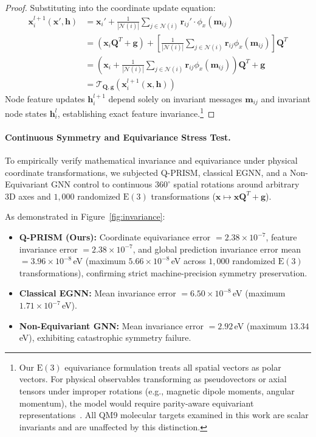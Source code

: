 \documentclass[10pt,twocolumn,letterpaper]{article}
\begin{document}
\begin{proof}
Substituting into the coordinate update equation:
\begin{align}
    \mathbf{x}_i^{l+1}(\mathbf{x}', \mathbf{h}) &= \mathbf{x}_i' + \frac{1}{|\mathcal{N}(i)|} \sum_{j \in \mathcal{N}(i)} \mathbf{r}_{ij}' \cdot \phi_x(\mathbf{m}_{ij}) \nonumber \\
    &= (\mathbf{x}_i \mathbf{Q}^T + \mathbf{g}) + \left[\frac{1}{|\mathcal{N}(i)|} \sum_{j \in \mathcal{N}(i)} \mathbf{r}_{ij} \phi_x(\mathbf{m}_{ij})\right] \mathbf{Q}^T \nonumber \\
    &= \left(\mathbf{x}_i + \frac{1}{|\mathcal{N}(i)|} \sum_{j \in \mathcal{N}(i)} \mathbf{r}_{ij} \phi_x(\mathbf{m}_{ij})\right) \mathbf{Q}^T + \mathbf{g} \nonumber \\
    &= \mathcal{T}_{\mathbf{Q}, \mathbf{g}}(\mathbf{x}_i^{l+1}(\mathbf{x}, \mathbf{h}))
\end{align}
Node feature updates $\mathbf{h}_i^{l+1}$ depend solely on invariant messages $\mathbf{m}_{ij}$ and invariant node states $\mathbf{h}_i^l$, establishing exact feature invariance.\footnote{Our $\mathrm{E}(3)$ equivariance formulation treats all spatial vectors as polar vectors. For physical observables transforming as pseudovectors or axial tensors under improper rotations (e.g., magnetic dipole moments, angular momentum), the model would require parity-aware equivariant representations~\cite{batatiaMACEHigherOrder2022}. All QM9 molecular targets examined in this work are scalar invariants and are unaffected by this distinction.}
\end{proof}

\paragraph{Continuous Symmetry and Equivariance Stress Test.}
To empirically verify mathematical invariance and equivariance under physical coordinate transformations, we subjected Q-PRISM, classical EGNN, and a Non-Equivariant GNN control to continuous $360^\circ$ spatial rotations around arbitrary 3D axes and $1{,}000$ randomized $\mathrm{E}(3)$ transformations ($\mathbf{x} \mapsto \mathbf{x}\mathbf{Q}^T + \mathbf{g}$).

As demonstrated in Figure~\ref{fig:invariance}:
\begin{itemize}
    \item \textbf{Q-PRISM (Ours):} Coordinate equivariance error $= 2.38 \times 10^{-7}$, feature invariance error $= 2.38 \times 10^{-7}$, and global prediction invariance error mean $= 3.96 \times 10^{-8}$\,eV (maximum $5.66 \times 10^{-8}$\,eV across $1{,}000$ randomized $\mathrm{E}(3)$ transformations), confirming strict machine-precision symmetry preservation.
    \item \textbf{Classical EGNN:} Mean invariance error $= 6.50 \times 10^{-8}$\,eV (maximum $1.71 \times 10^{-7}$\,eV).
    \item \textbf{Non-Equivariant GNN:} Mean invariance error $= 2.92$\,eV (maximum $13.34$\,eV), exhibiting catastrophic symmetry failure.
\end{itemize}
\end{document}
